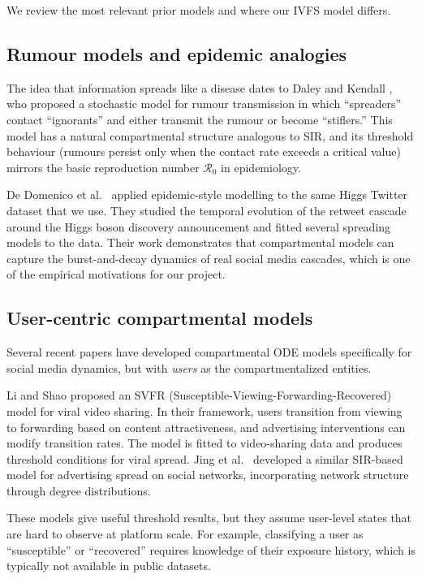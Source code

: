 \documentclass[11pt]{article}
\begin{document}
We review the most relevant prior models and where our IVFS model differs.

\subsection{Rumour models and epidemic analogies}

The idea that information spreads like a disease dates to Daley and Kendall \cite{daleyKendall1964}, who proposed a stochastic model for rumour transmission in which ``spreaders'' contact ``ignorants'' and either transmit the rumour or become ``stiflers.'' This model has a natural compartmental structure analogous to SIR, and its threshold behaviour (rumours persist only when the contact rate exceeds a critical value) mirrors the basic reproduction number $\mathcal{R}_0$ in epidemiology.

De Domenico et al.\ \cite{domenico2013} applied epidemic-style modelling to the same Higgs Twitter dataset that we use. They studied the temporal evolution of the retweet cascade around the Higgs boson discovery announcement and fitted several spreading models to the data. Their work demonstrates that compartmental models can capture the burst-and-decay dynamics of real social media cascades, which is one of the empirical motivations for our project.

\subsection{User-centric compartmental models}

Several recent papers have developed compartmental ODE models specifically for social media dynamics, but with \emph{users} as the compartmentalized entities.

Li and Shao \cite{liShao2024} proposed an SVFR (Susceptible-Viewing-Forwarding-Recovered) model for viral video sharing. In their framework, users transition from viewing to forwarding based on content attractiveness, and advertising interventions can modify transition rates. The model is fitted to video-sharing data and produces threshold conditions for viral spread. Jing et al.\ \cite{jing2018} developed a similar SIR-based model for advertising spread on social networks, incorporating network structure through degree distributions.

These models give useful threshold results, but they assume user-level states that are hard to observe at platform scale. For example, classifying a user as ``susceptible'' or ``recovered'' requires knowledge of their exposure history, which is typically not available in public datasets.
\end{document}
